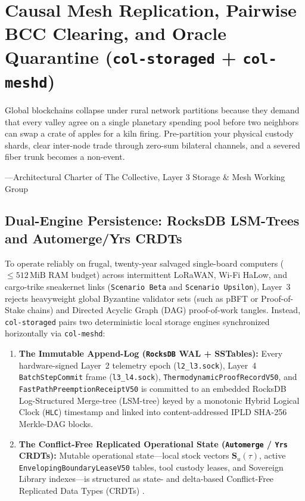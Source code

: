 \chapter{Causal Mesh Replication, Pairwise BCC Clearing, and Oracle Quarantine (\texttt{col-storaged} + \texttt{col-meshd})}
\label{ch:causal-mesh-bcc}

\epigraph{Global blockchains collapse under rural network partitions because they demand that every valley agree on a single planetary spending pool before two neighbors can swap a crate of apples for a kiln firing. Pre-partition your physical custody shards, clear inter-node trade through zero-sum bilateral channels, and a severed fiber trunk becomes a non-event.}{---Architectural Charter of The Collective, Layer 3 Storage \& Mesh Working Group}

\section{Dual-Engine Persistence: RocksDB LSM-Trees and Automerge/Yrs CRDTs}
\label{sec:ch9-dual-engine}

To operate reliably on frugal, twenty-year salvaged single-board computers ($\le 512\,\mathrm{MiB}$ RAM budget) across intermittent LoRaWAN, Wi-Fi HaLow, and cargo-trike sneakernet links (\texttt{Scenario Beta} and \texttt{Scenario Upsilon}), Layer~3 rejects heavyweight global Byzantine validator sets (such as pBFT or Proof-of-Stake chains) and Directed Acyclic Graph (DAG) proof-of-work tangles. Instead, \texttt{col-storaged} pairs two deterministic local storage engines synchronized horizontally via \texttt{col-meshd}:

\begin{enumerate}
    \item \textbf{The Immutable Append-Log (\texttt{RocksDB} WAL + SSTables):} Every hardware-signed Layer~2 telemetry epoch (\texttt{l2\_l3.sock}), Layer~4 \texttt{BatchStepCommit} frame (\texttt{l3\_l4.sock}), \texttt{ThermodynamicProofRecordV50}, and \texttt{FastPathPreemptionReceiptV50} is committed to an embedded RocksDB Log-Structured Merge-tree (LSM-tree) \parencite{oneil1996lsm,dong2021rocksdb} keyed by a monotonic Hybrid Logical Clock (\texttt{HLC}) timestamp \parencite{kulkarni2014logical} and linked into content-addressed IPLD SHA-256 Merkle-DAG blocks.
    \item \textbf{The Conflict-Free Replicated Operational State (\texttt{Automerge} / \texttt{Yrs} CRDTs):} Mutable operational state---local stock vectors $\mathbf{S}_u(\tau)$, active \texttt{EnvelopingBoundaryLeaseV50} tables, tool custody leases, and Sovereign Library indexes---is structured as state- and delta-based Conflict-Free Replicated Data Types (CRDTs) \parencite{shapiro2011crdt,kleppmann2017automerge}.
\end{enumerate}

